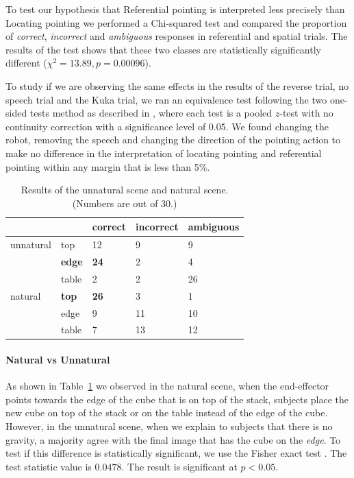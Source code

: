 \documentclass[letterpaper]{article} %
\begin{document}
To test our hypothesis that Referential pointing is interpreted less precisely than Locating pointing we performed a Chi-squared test and compared the proportion of \textit{correct}, \textit{incorrect} and \textit{ambiguous} responses in referential and spatial trials. The results of the test shows that these two classes are statistically significantly different ($\chi^2= 13.89, p = 0.00096$).

To study if we are observing the same effects in the results of the reverse trial, no speech trial and the Kuka trial, we ran an equivalence test following the two one-sided tests method as described in \cite{lakens2017equivalence}, where each test is a pooled $z$-test with no continuity
correction with a significance level of 0.05. We found changing the robot, removing the speech and changing the direction of the pointing action to make no difference in the interpretation of locating pointing and referential pointing within any margin that is less than 5\%.


\begin{table}[h]
\label{tab:naturaltrial}
\begin{tabular}{lllll}
          &               & correct     & incorrect & ambiguous \\ \hline
unnatural & top           & 12          & 9         & 9         \\
          & \textbf{edge} & \textbf{24} & 2         & 4         \\
          & table         & 2           & 2         & 26        \\ \hline
natural   & \textbf{top}  & \textbf{26} & 3         & 1         \\
          & edge          & 9           & 11        & 10        \\
          & table         & 7           & 13        & 12        \\ \hline
\end{tabular}
\caption{Results of the unnatural scene and natural scene. (Numbers are out of 30.)}
\label{tab:natural-unnatural}
\end{table}

\paragraph{Natural vs Unnatural}

As shown in Table~\ref{tab:natural-unnatural} we observed in the natural scene, when the end-effector points towards the edge of the cube that is on top of the stack, subjects place the new cube on top of the stack or on the table instead of the edge of the cube. However, in the unnatural scene, when we explain to subjects that there is no gravity, a majority agree with the final image that has the cube on the \textit{edge}. To test if this difference is statistically significant, we use the Fisher exact test \cite{10.2307/2340manuelli2019kpam521}. 
The test statistic value is $0.0478$. The result is significant at $p < 0.05$. 
\end{document}
